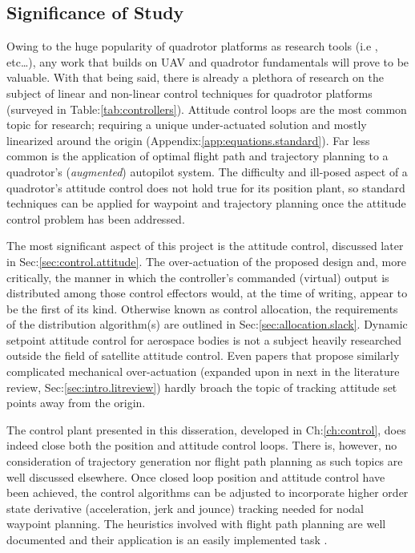 \subsection{Significance of Study}
\label{subsec:intro.foreword.significance}
Owing to the huge popularity of quadrotor platforms as research tools (i.e \cite{x4flyercontrol,intelligentbackstep,fullquadcoptercontrol}, etc\ldots), any work that builds on UAV and quadrotor fundamentals will prove to be valuable. With that being said, there is already a plethora of research on the subject of linear and non-linear control techniques for quadrotor platforms (surveyed in Table:\ref{tab:controllers}). Attitude control loops are the most common topic for research; requiring a unique under-actuated solution and mostly linearized around the origin (Appendix:\ref{app:equations.standard}). Far less common is the application of optimal flight path and trajectory planning to a quadrotor's (\emph{augmented}) autopilot system. The difficulty and ill-posed aspect of a quadrotor's attitude control does not hold true for its position plant, so standard techniques can be applied for waypoint and trajectory planning once the attitude control problem has been addressed.
\par
The most significant aspect of this project is the attitude control, discussed later in Sec:\ref{sec:control.attitude}. The over-actuation of the proposed design and, more critically, the manner in which the controller's commanded (virtual) output is distributed among those control effectors would, at the time of writing, appear to be the first of its kind. Otherwise known as control allocation, the requirements of the distribution algorithm(s) are outlined in Sec:\ref{sec:allocation.slack}. Dynamic setpoint attitude control for aerospace bodies is not a subject heavily researched outside the field of satellite attitude control. Even papers that propose similarly complicated mechanical over-actuation (expanded upon in next in the literature review, Sec:\ref{sec:intro.litreview}) hardly broach the topic of tracking attitude set points away from the origin.
\par
The control plant presented in this disseration, developed in Ch:\ref{ch:control}, does indeed close both the position and attitude control loops. There is, however, no consideration of trajectory generation nor flight path planning as such topics are well discussed elsewhere. Once closed loop position and attitude control have been achieved, the control algorithms can be adjusted to incorporate higher order state derivative (acceleration, jerk and jounce) tracking needed for nodal waypoint planning. The heuristics involved with flight path planning are well documented and their application is an easily implemented task \cite{trajectorygeneration,modelingquadcopter,trajectorytracking}.
